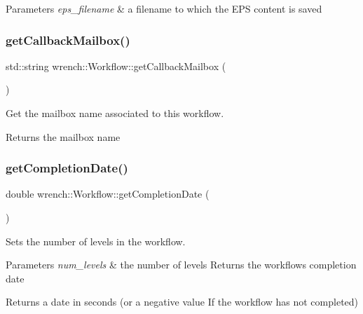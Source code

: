 \begin{DoxyParams}{Parameters}
{\em eps\+\_\+filename} & a filename to which the E\+PS content is saved \\
\hline
\end{DoxyParams}
\mbox{\label{classwrench_1_1_workflow_a234829c4fa09adab0e5d91324cf118fe}} 
\subsubsection{\texorpdfstring{get\+Callback\+Mailbox()}{getCallbackMailbox()}}
{\footnotesize\ttfamily std\+::string wrench\+::\+Workflow\+::get\+Callback\+Mailbox (\begin{DoxyParamCaption}{ }\end{DoxyParamCaption})}



Get the mailbox name associated to this workflow. 

\begin{DoxyReturn}{Returns}
the mailbox name 
\end{DoxyReturn}
\mbox{\label{classwrench_1_1_workflow_ac3a1291469d2c0035352a99f0f964f3f}} 
\subsubsection{\texorpdfstring{get\+Completion\+Date()}{getCompletionDate()}}
{\footnotesize\ttfamily double wrench\+::\+Workflow\+::get\+Completion\+Date (\begin{DoxyParamCaption}{ }\end{DoxyParamCaption})}



Sets the number of levels in the workflow. 


\begin{DoxyParams}{Parameters}
{\em num\+\_\+levels} & the number of levels Returns the workflow\textquotesingle{}s completion date \\
\hline
\end{DoxyParams}
\begin{DoxyReturn}{Returns}
a date in seconds (or a negative value If the workflow has not completed) 
\end{DoxyReturn}
\mbox{\label{classwrench_1_1_workflow_a19b3b6f36f684f8c367f42a818b0a0c2}} 
